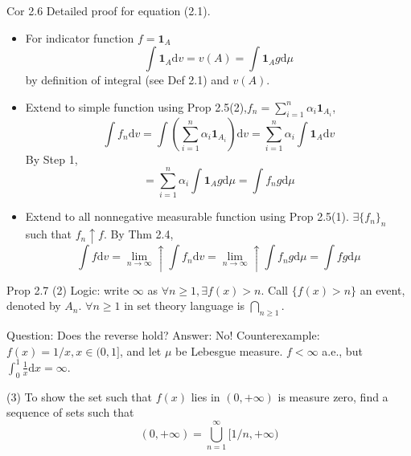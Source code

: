 \begin{note}{Cor 2.6}
    Detailed proof for equation (2.1). 
    \begin{itemize}
        \item[(Step 1)] For indicator function $f=\mathbf{1}_A$
        \[
        \int \mathbf{1}_A\mathrm{d}v=v(A)=\int \mathbf{1}_A g\mathrm{d}\mu
        \]
        by definition of integral (see Def 2.1) and $v(A)$.
        \item[(Step 2)] Extend to simple function using Prop 2.5(2),$f_n=\sum_{i=1}^n \alpha_i \mathbf{1}_{A_i}$,
        \[
        \int f_n\mathrm{d}v=\int \left(\sum_{i=1}^n \alpha_i \mathbf{1}_{A_i}\right)\mathrm{d}v=\sum_{i=1}^n\alpha_i\int \mathbf{1}_A\mathrm{d}v
        \]
        By Step 1,
        \[
        =\sum_{i=1}^n\alpha_i\int \mathbf{1}_A g\mathrm{d}\mu=\int f_n g\mathrm{d}\mu
        \]
        \item[(Step 3)] Extend to all nonnegative measurable function using Prop 2.5(1). $\exists \{f_n\}_n$ such that $f_n\uparrow f$. By Thm 2.4,
        \[
        \int f\mathrm{d}v=\lim_{n\to\infty}\uparrow \int f_n\mathrm{d}v=\lim_{n\to\infty}\uparrow \int f_n g\mathrm{d}\mu=\int f g\mathrm{d}\mu
        \]
    \end{itemize}
\end{note}

\begin{note}{Prop 2.7}
    (2) Logic: write $\infty$ as $\forall n\ge 1, \exists f(x)>n$. Call $\{f(x)>n\}$ an event, denoted by $A_n$. $\forall n\ge 1$ in set theory language is $\bigcap_{n\ge 1}$.

    Question: Does the reverse hold? Answer: No! Counterexample: $f(x)=1/x,x\in(0,1]$, and let $\mu$ be Lebesgue measure. $f<\infty$ a.e., but $\int_0^1 \frac{1}{x}\mathrm{d}x=\infty$.

    (3) To show the set such that $f(x)$ lies in $(0,+\infty)$ is measure zero, find a sequence of sets such that
    \[
    (0,+\infty)=\bigcup_{n=1}^{\infty}[1/n,+\infty)
    \]
\end{note}

